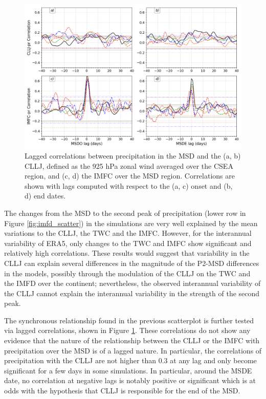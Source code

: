 \begin{figure}[t!]
\includegraphics[width=\linewidth]{figures/lag_imfdcllj.png}
\caption[Lagged correlations of the CLLJ and IMFC indices with precipitation.]{Lagged correlations between precipitation in the MSD and the (a, b) CLLJ, defined as the 925 hPa zonal wind averaged over the CSEA region, and (c, d) the IMFC over the MSD region. Correlations are shown with lags computed with respect to the (a, c) onset and (b, d) end dates.  }
\label{fig:cllj_lag}
\end{figure}



The changes from the MSD to the second peak of precipitation (lower row in Figure \ref{fig:imfd_scatter}) in the simulations are very well explained by the mean variations to the CLLJ, the TWC and the IMFC. However, for the interannual variability of ERA5, only changes to the TWC and IMFC show significant and relatively high correlations. These results would suggest that variability in the CLLJ can explain several differences in the magnitude of the P2-MSD differences in the models, possibly through the modulation of the CLLJ on the TWC and the IMFD over the continent; nevertheless, the observed interannual variability of the CLLJ cannot explain the interannual variability in the strength of the second peak. %

The synchronous relationship found in the previous scatterplot is further tested via lagged correlations, shown in Figure \ref{fig:cllj_lag}. These correlations do not show any evidence that the nature of the relationship between the CLLJ or the IMFC with precipitation over the MSD is of a lagged nature. In particular, the correlations of precipitation with the CLLJ are not higher than 0.3 at any lag and only become significant for a few days in some simulations. In particular, around the MSDE date, no correlation at negative lags is notably positive or significant which is at odds with the hypothesis that CLLJ is responsible for the end of the MSD. 

